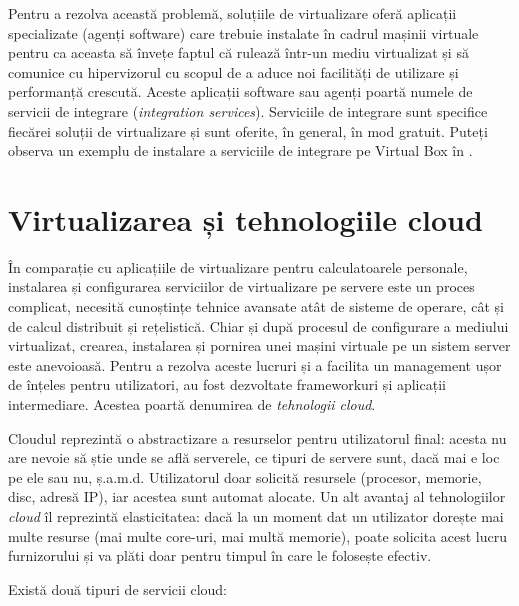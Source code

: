 Pentru a rezolva această problemă, soluțiile de virtualizare oferă aplicații specializate (agenți software) care trebuie instalate în cadrul mașinii virtuale pentru ca aceasta să învețe faptul că rulează într-un mediu virtualizat și să comunice cu hipervizorul cu scopul de a aduce noi facilități de utilizare și performanță crescută.
Aceste aplicații software sau agenți poartă numele de servicii de integrare (\textit{integration services}).
Serviciile de integrare sunt specifice fiecărei soluții de virtualizare și sunt oferite, în general, în mod gratuit.
Puteți observa un exemplu de instalare a serviciile de integrare pe Virtual Box în .

\section{Virtualizarea și tehnologiile cloud}
\label{sec:vm:cloud}

În comparație cu aplicațiile de virtualizare pentru calculatoarele personale, instalarea și configurarea serviciilor de virtualizare pe servere este un proces complicat, necesită cunoștințe tehnice avansate atât de sisteme de operare, cât și de calcul distribuit și rețelistică.
Chiar și după procesul de configurare a mediului virtualizat, crearea, instalarea și pornirea unei mașini virtuale pe un sistem server este anevoioasă.
 Pentru a rezolva aceste lucruri și a facilita un management ușor de înțeles pentru utilizatori, au fost dezvoltate frameworkuri și aplicații intermediare.
Acestea poartă denumirea de \textit{tehnologii cloud}.

Cloudul reprezintă o abstractizare a resurselor pentru utilizatorul final: acesta nu are nevoie să știe unde se află serverele, ce tipuri de servere sunt, dacă mai e loc pe ele sau nu, ș.a.m.d.
 Utilizatorul doar solicită resursele (procesor, memorie, disc, adresă IP), iar acestea sunt automat alocate.
Un alt avantaj al tehnologiilor \textit{cloud} îl reprezintă elasticitatea: dacă la un moment dat un utilizator dorește mai multe resurse (mai multe core-uri, mai multă memorie), poate solicita acest lucru furnizorului și va plăti doar pentru timpul în care le folosește efectiv.

Există două tipuri de servicii cloud:


